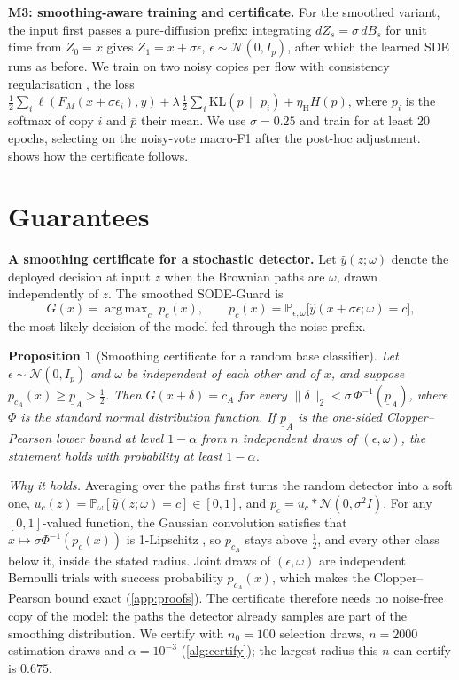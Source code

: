 \documentclass{article}
\newtheorem{proposition}{Proposition}
\theoremstyle{definition}
\newcommand{\Prob}{\mathbb{P}}
\DeclareMathOperator*{\argmax}{arg\,max}
\begin{document}
\textbf{M3: smoothing-aware training and certificate.} For the smoothed
variant, the input first passes a pure-diffusion prefix: integrating
$dZ_s=\sigma\,dB_s$ for unit time from $Z_0=x$ gives $Z_1=x+\sigma\epsilon$,
$\epsilon\sim\mathcal N(0,I_p)$, after which the learned SDE runs as before. We
train on two noisy copies per flow with consistency regularisation
\citep{jeong2020consistency}, the loss
$\tfrac12\sum_i\ell(F_M(x+\sigma\epsilon_i),y)
+\lambda\,\tfrac12\sum_i\mathrm{KL}(\bar p\,\|\,p_i)+\eta_{\mathrm H}H(\bar p)$, where
$p_i$ is the softmax of copy $i$ and $\bar p$ their mean. We use $\sigma=0.25$
and train for at least 20 epochs, selecting on the noisy-vote macro-F1 after
the post-hoc adjustment.  shows how the certificate follows.

\section{Guarantees}\label{sec:theory}
\textbf{A smoothing certificate for a stochastic detector.} Let
$\hat y(z;\omega)$ denote the deployed decision at input $z$ when the Brownian
paths are $\omega$, drawn independently of $z$. The smoothed SODE-Guard is
\begin{equation}\label{eq:smoothed}
  G(x)=\argmax_c\;p_c(x),\qquad p_c(x)=\Prob_{\epsilon,\omega}\bigl[\hat y(x+\sigma\epsilon;\omega)=c\bigr],
\end{equation}
the most likely decision of the model fed through the noise prefix.

\begin{proposition}[Smoothing certificate for a random base classifier]\label{prop:smooth}
Let $\epsilon\sim\mathcal N(0,I_p)$ and $\omega$ be independent of each other
and of $x$, and suppose $p_{c_A}(x)\ge\underline p_A>\tfrac12$. Then
$G(x+\delta)=c_A$ for every $\|\delta\|_2<\sigma\,\Phi^{-1}(\underline p_A)$,
where $\Phi$ is the standard normal distribution function. If
$\underline p_A$ is the one-sided Clopper--Pearson lower bound at level
$1-\alpha$ from $n$ independent draws of $(\epsilon,\omega)$, the statement holds
with probability at least $1-\alpha$.
\end{proposition}

\emph{Why it holds.} Averaging over the paths first turns the random detector
into a soft one, $u_c(z)=\Prob_\omega[\hat y(z;\omega)=c]\in[0,1]$, and
$p_c=u_c*\mathcal N(0,\sigma^2I)$. For any $[0,1]$-valued function, the
Gaussian convolution satisfies that $x\mapsto\sigma\Phi^{-1}(p_c(x))$ is
1-Lipschitz \citep[Lemma~2]{salman2019smoothadv}, so $p_{c_A}$ stays above
$\tfrac12$, and every other class below it, inside the stated radius. Joint
draws of $(\epsilon,\omega)$ are independent Bernoulli trials with success
probability $p_{c_A}(x)$, which makes the Clopper--Pearson bound exact
(\cref{app:proofs}). The certificate therefore needs no noise-free copy of the
model: the paths the detector already samples are part of the smoothing
distribution. We certify with $n_0=100$ selection draws, $n=2000$ estimation
draws and $\alpha=10^{-3}$ (\cref{alg:certify}); the largest radius this $n$ can
certify is $0.675$.
\end{document}
